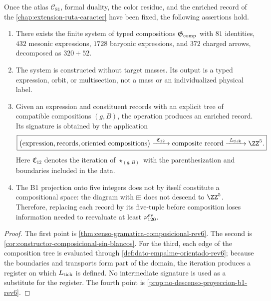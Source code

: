 \begin{theorem}
\label{thm:cierre-composicional-sin-blancos-rev6}
Once the atlas \(\mathcal C_{81}\), formal duality, the color residue,
and the enriched record of the \cref{chap:extension-ruta-caracter} have been fixed, the following
assertions hold.
\begin{enumerate}
 \item There exists the finite system of typed compositions
 \(\mathfrak G_{\rm comp}\) with \(81\) identities, \(432\) mesonic expressions,
 \(1728\) baryonic expressions, and \(372\) charged arrows,
 decomposed as \(320+52\).

 \item The system is constructed without target masses. Its output is a
 typed expression, orbit, or multisection, not a mass or an individualized
 physical label.

 \item Given an expression and constituent records with an
 explicit tree of compatible compositions \((g,B)\), the operation produces an
 enriched record. Its signature is obtained by the application
 \[
 \boxed{
 \bigl(
 \text{expression},
 \text{records},
 \text{oriented compositions}
 \bigr)
 \xrightarrow{\ \mathfrak C_{12}\ }
 \text{composite record}
 \xrightarrow{\ L_{\rm tick}\ }
 \ZZ^5.}
 \]
 Here \(\mathfrak C_{12}\) denotes the iteration of
 \(\star_{(g,B)}\) with the parenthesization and boundaries included in the data.

 \item The B1 projection onto five integers does not by itself constitute a
 compositional space: the diagram with \(\boxplus\) does not descend to
 \(\ZZ^5\). Therefore, replacing each record by its five-tuple before
 composition loses information needed to reevaluate at least
 \(\nu_{120}^{\rm ev}\).
\end{enumerate}
\end{theorem}

\begin{proof}
The first point is \cref{thm:censo-gramatica-composicional-rev6}. The second is \cref{cor:constructor-composicional-sin-blancos}. For the third, each edge of the composition tree is evaluated through \cref{def:dato-empalme-orientado-rev6}; because the boundaries and transports form part of the domain, the iteration produces a register on which \(L_{\rm tick}\) is defined. No intermediate signature is used as a substitute for the register. The fourth point is \cref{prop:no-descenso-proyeccion-b1-rev6}.
\end{proof}

